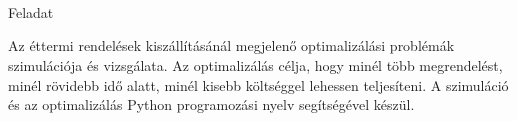 \documentclass[12pt,a4paper]{article}
\begin{document}
\begin{flushleft}
\\
\end{flushleft}
\begin{flushleft}
\\
\end{flushleft}
\begin{flushleft}
\\
\end{flushleft}
\begin{flushleft}
\\
\end{flushleft}
\begin{flushleft}
\\
\end{flushleft}
\begin{flushleft}
\\
\end{flushleft}
\begin{flushleft}
\\
\end{flushleft}
\begin{flushleft}
\\
\end{flushleft}
\begin{flushleft}
\\
\end{flushleft}
\begin{flushleft}
\\
\end{flushleft}
\begin{flushleft}
\\
\end{flushleft}
\begin{flushleft}
\\
\end{flushleft}
\begin{flushleft}
\\
\end{flushleft}

\begin{flushleft}
\begin{large}

Feladat

\end{large}
\end{flushleft}

Az éttermi rendelések kiszállításánál megjelenő optimalizálási problémák szimulációja és vizsgálata. Az optimalizálás célja, hogy minél több megrendelést, minél rövidebb idő alatt, minél kisebb költséggel lehessen teljesíteni. A szimuláció és az optimalizálás Python programozási nyelv segítségével készül.
\end{document}
